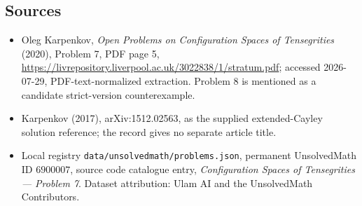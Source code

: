 \documentclass[11pt]{article}
\begin{document}
\subsection{Sources}
\begin{itemize}
\item Oleg Karpenkov, \emph{Open Problems on Configuration Spaces of Tensegrities} (2020), Problem 7, PDF page 5, \url{https://livrepository.liverpool.ac.uk/3022838/1/stratum.pdf}; accessed 2026-07-29, PDF-text-normalized extraction. Problem 8 is mentioned as a candidate strict-version counterexample.
\item Karpenkov (2017), arXiv:1512.02563, as the supplied extended-Cayley solution reference; the record gives no separate article title.
\item Local registry \texttt{data/unsolvedmath/problems.json}, permanent UnsolvedMath ID $6900007$, source code catalogue entry, \emph{Configuration Spaces of Tensegrities --- Problem 7}. Dataset attribution: Ulam AI and the UnsolvedMath Contributors.
\end{itemize}
\end{document}
